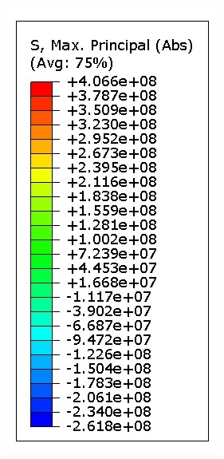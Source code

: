 \documentclass[preprint,review,12pt]{elsarticle}
\begin{document}
\begin{figure}[htbp]
\begin{minipage}[t]{0.28\textwidth}
\centering
\vspace{-2cm}
\includegraphics[width=\textwidth]{Abaqus/DSID/DSID_scale.jpg}

\end{minipage}
\end{figure}
\end{document}
